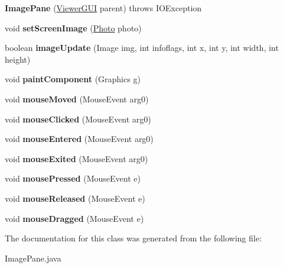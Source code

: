 \begin{DoxyCompactItemize}
\item 
\hypertarget{class_image_pane_a370a844b6b3ca53f6f46c9bf9eacea0d}{{\bfseries Image\-Pane} (\hyperlink{class_viewer_g_u_i}{Viewer\-G\-U\-I} parent)  throws I\-O\-Exception}\label{class_image_pane_a370a844b6b3ca53f6f46c9bf9eacea0d}

\item 
\hypertarget{class_image_pane_a23cfe102398698d805849dae2ec47e5d}{void {\bfseries set\-Screen\-Image} (\hyperlink{class_photo}{Photo} photo)}\label{class_image_pane_a23cfe102398698d805849dae2ec47e5d}

\item 
\hypertarget{class_image_pane_a9ec3e046d345688f9a07f67ec71fedf2}{boolean {\bfseries image\-Update} (Image img, int infoflags, int x, int y, int width, int height)}\label{class_image_pane_a9ec3e046d345688f9a07f67ec71fedf2}

\item 
\hypertarget{class_image_pane_a88fe5d1f503edb079fa8dc14f222ac37}{void {\bfseries paint\-Component} (Graphics g)}\label{class_image_pane_a88fe5d1f503edb079fa8dc14f222ac37}

\item 
\hypertarget{class_image_pane_a3121ca3a794eed6b5cd5248e05ffdc0f}{void {\bfseries mouse\-Moved} (Mouse\-Event arg0)}\label{class_image_pane_a3121ca3a794eed6b5cd5248e05ffdc0f}

\item 
\hypertarget{class_image_pane_a73e8b977b5d37689b78b75ef58ed7586}{void {\bfseries mouse\-Clicked} (Mouse\-Event arg0)}\label{class_image_pane_a73e8b977b5d37689b78b75ef58ed7586}

\item 
\hypertarget{class_image_pane_ac1598e74cca9e8705a1fab96c67210ce}{void {\bfseries mouse\-Entered} (Mouse\-Event arg0)}\label{class_image_pane_ac1598e74cca9e8705a1fab96c67210ce}

\item 
\hypertarget{class_image_pane_ae5fd189211613be83cc8e28000123c5c}{void {\bfseries mouse\-Exited} (Mouse\-Event arg0)}\label{class_image_pane_ae5fd189211613be83cc8e28000123c5c}

\item 
\hypertarget{class_image_pane_a448ca5113bef60eed8460be3a9451f11}{void {\bfseries mouse\-Pressed} (Mouse\-Event e)}\label{class_image_pane_a448ca5113bef60eed8460be3a9451f11}

\item 
\hypertarget{class_image_pane_adc4d5e86b56dab9fb6e8d37fcea5b239}{void {\bfseries mouse\-Released} (Mouse\-Event e)}\label{class_image_pane_adc4d5e86b56dab9fb6e8d37fcea5b239}

\item 
\hypertarget{class_image_pane_af6f08d292b6fdf7ca49bbedff10a1965}{void {\bfseries mouse\-Dragged} (Mouse\-Event e)}\label{class_image_pane_af6f08d292b6fdf7ca49bbedff10a1965}

\end{DoxyCompactItemize}


The documentation for this class was generated from the following file\-:\begin{DoxyCompactItemize}
\item 
Image\-Pane.\-java\end{DoxyCompactItemize}
